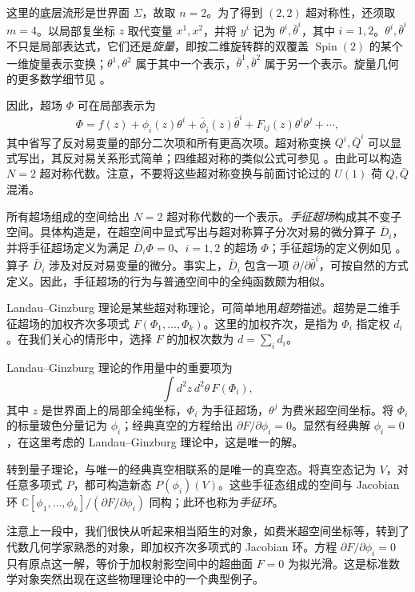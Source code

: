 这里的底层流形是世界面 $\Sigma$，故取 $n=2$。为了得到 $(2,2)$ 超对称性，还须取 $m=4$。以局部复坐标 $z$ 取代变量 $x^1,x^2$，并将 $y^i$ 记为 $\theta^i,\bar\theta^i$，其中 $i=1,2$。$\theta^i,\bar\theta^i$ 不只是局部表达式，它们还是\emph{旋量}，即按二维旋转群的双覆盖 $\operatorname{Spin}(2)$ 的某个一维旋量表示变换；$\theta^1,\theta^2$ 属于其中一个表示，$\bar\theta^1,\bar\theta^2$ 属于另一个表示。旋量几何的更多数学细节见 。

因此，超场 $\Phi$ 可在局部表示为
\[
\Phi=f(z)+\phi_i(z)\theta^i+\bar\phi_i(z)\bar\theta^i
+F_{ij}(z)\theta^i\theta^j+\cdots,
\]
其中省写了反对易变量的部分二次项和所有更高次项。超对称变换 $Q^i,\bar Q^i$ 可以显式写出，其反对易关系形式简单；四维超对称的类似公式可参见 。由此可以构造 $N=2$ 超对称代数。注意，不要将这些超对称变换与前面讨论过的 $U(1)$ 荷 $Q,\bar Q$ 混淆。

所有超场组成的空间给出 $N=2$ 超对称代数的一个表示。\emph{手征超场}构成其不变子空间。具体构造是，在超空间中显式写出与超对称算子分次对易的微分算子 $\bar D_i$，并将手征超场定义为满足 $\bar D_i\Phi=0$、$i=1,2$ 的超场 $\Phi$；手征超场的定义例如见 。算子 $\bar D_i$ 涉及对反对易变量的微分。事实上，$\bar D_i$ 包含一项 $\partial/\partial\bar\theta^i$，可按自然的方式定义。因此，手征超场的行为与普通空间中的全纯函数颇为相似。

Landau--Ginzburg 理论是某些超对称理论，可简单地用\emph{超势}描述。超势是二维手征超场的加权齐次多项式
$F(\Phi_1,\ldots,\Phi_k)$。这里的加权齐次，是指为 $\Phi_i$ 指定权 $d_i$。在我们关心的情形中，选择 $F$ 的加权次数为 $d=\sum_i d_i$。

Landau--Ginzburg 理论的作用量中的重要项为
\begin{equation}\label{eq:landau-ginzburg-superpotential-term}
\int d^2z\,d^2\theta\,F(\Phi_i),
\end{equation}
其中 $z$ 是世界面上的局部全纯坐标，$\Phi_i$ 为手征超场，$\theta^j$ 为费米超空间坐标。将 $\Phi_i$ 的标量玻色分量记为 $\phi_i$；经典真空的方程给出 $\partial F/\partial\phi_i=0$。显然有经典解 $\phi_i=0$，在这里考虑的 Landau--Ginzburg 理论中，这是唯一的解。

转到量子理论，与唯一的经典真空相联系的是唯一的真空态。将真空态记为 $V$，对任意多项式 $P$，都可构造新态 $P(\phi_i)(V)$。这些手征态组成的空间与 Jacobian 环 $\mathbb C[\phi_1,\ldots,\phi_k]/(\partial F/\partial\phi_i)$ 同构；此环也称为\emph{手征环}。

注意上一段中，我们很快从听起来相当陌生的对象，如费米超空间坐标等，转到了代数几何学家熟悉的对象，即加权齐次多项式的 Jacobian 环。方程 $\partial F/\partial\phi_i=0$ 只有原点这一解，等价于加权射影空间中的超曲面 $F=0$ 为拟光滑。这是标准数学对象突然出现在这些物理理论中的一个典型例子。

